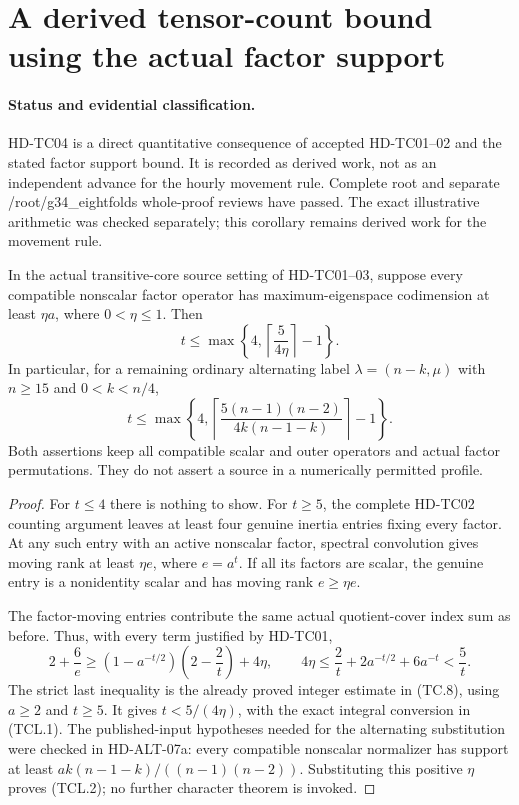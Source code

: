 \section{A derived tensor-count bound using the actual factor support}
\label{sec:tensor-count-local-support}

\paragraph{Status and evidential classification.}
HD-TC04 is a direct quantitative consequence of accepted HD-TC01--02
and the stated factor support bound. It is recorded as derived work,
not as an independent advance for the hourly movement rule.
Complete root and separate /root/g34\_eightfolds whole-proof reviews
have passed. The exact illustrative arithmetic was checked separately;
this corollary remains derived work for the movement rule.

\begin{corollary}[HD-TC04]
In the actual transitive-core source setting of HD-TC01--03, suppose
every compatible nonscalar factor operator has maximum-eigenspace
codimension at least $\eta a$, where $0<\eta\le1$.
Then
\[
 t\le\max\left\{4,\left\lceil\frac5{4\eta}\right\rceil-1\right\}.
 \tag{TCL.1}
\]
In particular, for a remaining ordinary alternating label
$\lambda=(n-k,\mu)$ with $n\ge15$ and $0<k<n/4$,
\[
 t\le\max\left\{4,
   \left\lceil\frac{5(n-1)(n-2)}{4k(n-1-k)}\right\rceil-1\right\}.
 \tag{TCL.2}
\]
Both assertions keep all compatible scalar and outer operators and
actual factor permutations. They do not assert a source in a
numerically permitted profile.
\end{corollary}

\begin{proof}
For $t\le4$ there is nothing to show. For $t\ge5$, the complete
HD-TC02 counting argument leaves at least four genuine inertia
entries fixing every factor. At any such entry with an active
nonscalar factor, spectral convolution gives moving rank at least
$\eta e$, where $e=a^t$. If all its factors are scalar, the genuine
entry is a nonidentity scalar and has moving rank $e\ge\eta e$.

The factor-moving entries contribute the same actual quotient-cover
index sum as before. Thus, with every term justified by HD-TC01,
\[
 2+\frac6e\ge
 (1-a^{-t/2})\left(2-\frac2t\right)+4\eta,
 \qquad
 4\eta\le\frac2t+2a^{-t/2}+6a^{-t}<\frac5t.
 \tag{TCL.3}
\]
The strict last inequality is the already proved integer estimate
in (TC.8), using $a\ge2$ and $t\ge5$. It gives $t<5/(4\eta)$,
with the exact integral conversion in (TCL.1).
The published-input hypotheses needed for the alternating
substitution were checked in HD-ALT-07a: every compatible nonscalar
normalizer has support at least
$a k(n-1-k)/((n-1)(n-2))$. Substituting this positive $\eta$
proves (TCL.2); no further character theorem is invoked.
\end{proof}

